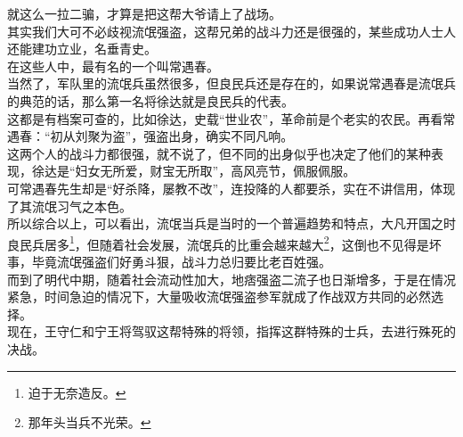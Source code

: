 \begin{multicols}{\theparacolNo}
就这么一拉二骗，才算是把这帮大爷请上了战场。\\

其实我们大可不必歧视流氓强盗，这帮兄弟的战斗力还是很强的，某些成功人士人还能建功立业，名垂青史。\\

在这些人中，最有名的一个叫常遇春。\\

当然了，军队里的流氓兵虽然很多，但良民兵还是存在的，如果说常遇春是流氓兵的典范的话，那么第一名将徐达就是良民兵的代表。\\

这都是有档案可查的，比如徐达，史载“世业农”，革命前是个老实的农民。再看常遇春：“初从刘聚为盗”，强盗出身，确实不同凡响。\\

这两个人的战斗力都很强，就不说了，但不同的出身似乎也决定了他们的某种表现，徐达是“妇女无所爱，财宝无所取”，高风亮节，佩服佩服。\\

可常遇春先生却是“好杀降，屡教不改”，连投降的人都要杀，实在不讲信用，体现了其流氓习气之本色。\\

所以综合以上，可以看出，流氓当兵是当时的一个普遍趋势和特点，大凡开国之时良民兵居多\footnote{迫于无奈造反。}，但随着社会发展，流氓兵的比重会越来越大\footnote{那年头当兵不光荣。}，这倒也不见得是坏事，毕竟流氓强盗们好勇斗狠，战斗力总归要比老百姓强。\\

而到了明代中期，随着社会流动性加大，地痞强盗二流子也日渐增多，于是在情况紧急，时间急迫的情况下，大量吸收流氓强盗参军就成了作战双方共同的必然选择。\\

现在，王守仁和宁王将驾驭这帮特殊的将领，指挥这群特殊的士兵，去进行殊死的决战。\\
\ifnum{}
	\end{multicols}
\fi
\newpage
